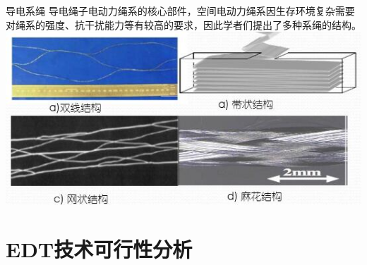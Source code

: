 \documentclass[sectioncirclenumberstyle]{le2iutbmbeamer}
\begin{document}
\begin{frame}[c]{导电系绳}
导电绳子电动力绳系的核心部件，空间电动力绳系因生存环境复杂需要对绳系的强度、抗干扰能力等有较高的要求，因此学者们提出了多种系绳的结构。
\centering
\includegraphics[width=0.9\linewidth]{figures/baretether}
\end{frame}
%
%
\section{EDT技术可行性分析}
\tableofcontentslide[sectionstyle={show/shaded},subsectionstyle={show/show/hide},subsubsectionstyle={hide/hide/hide/hide}]
\end{document}
